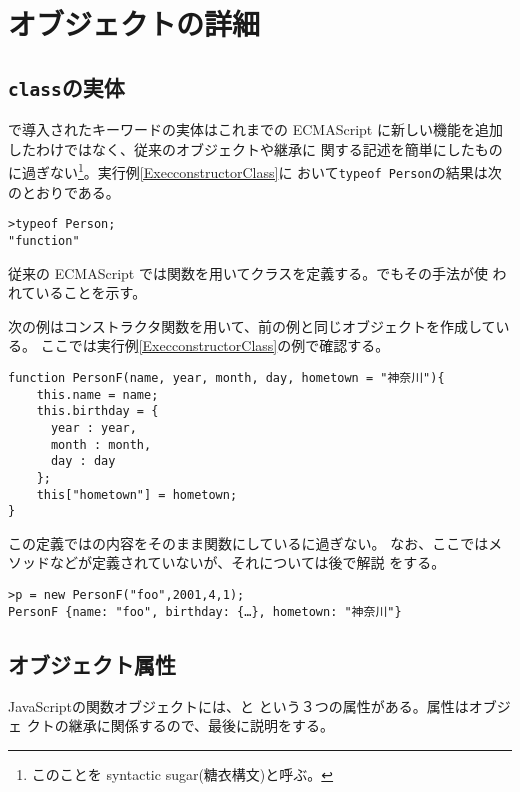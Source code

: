 \chapter{オブジェクトの詳細}
\section{\protect\texttt{class}の実体}
\ES で導入されたキーワードの実体はこれまでの
ECMAScript に新しい機能を追加したわけではなく、従来のオブジェクトや継承に
関する記述を簡単にしたものに過ぎない\footnote{このことを syntactic
sugar(糖衣構文)と呼ぶ。}。実行例\ref{ExecconstructorClass}に
おいて\texttt{typeof Person}の結果は次のとおりである。
\begin{Verbatim}
>typeof Person;
"function"
\end{Verbatim}
従来の ECMAScript では関数を用いてクラスを定義する。でもその手法が使
われていることを示す。
\begin{Exec}\label{constructor}\upshape
次の例はコンストラクタ関数を用いて、前の例と同じオブジェクトを作成している。
%
ここでは実行例\ref{ExecconstructorClass}の例で確認する。
\begin{Verbatim}
function PersonF(name, year, month, day, hometown = "神奈川"){
    this.name = name;
    this.birthday = {
      year : year,
      month : month,
      day : day
    };
    this["hometown"] = hometown;
}
\end{Verbatim}
 この定義ではの内容をそのまま関数にしているに過ぎない。
 なお、ここではメソッドなどが定義されていないが、それについては後で解説
 をする。
 \end{Exec}
\begin{Verbatim}
>p = new PersonF("foo",2001,4,1);
PersonF {name: "foo", birthday: {…}, hometown: "神奈川"}
\end{Verbatim}
\section{オブジェクト属性}
JavaScriptの関数オブジェクトには、と
という３つの属性がある。属性はオブジェ
クトの継承に関係するので、最後に説明をする。
